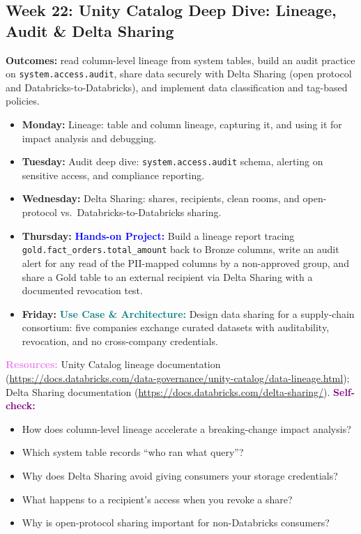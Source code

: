 \documentclass[11pt, a4paper]{article}
\newcommand{\project}[1]{\vspace{1mm}\noindent\textbf{\textcolor{blue}{Hands-on Project:}} #1}
\newcommand{\usecase}[1]{\vspace{1mm}\noindent\textbf{\textcolor{teal}{Use Case \& Architecture:}} #1}
\newcommand{\dayitem}[2]{\item \textbf{#1:} #2}
\newcommand{\resources}[1]{\vspace{1mm}\noindent\textbf{\textcolor{violet}{Resources:}} #1}
\newcommand{\selfcheck}[1]{\vspace{1mm}\noindent\textbf{\textcolor{purple}{Self-check:}} #1}
\begin{document}
\subsection*{Week 22: Unity Catalog Deep Dive: Lineage, Audit \& Delta Sharing}
\par\noindent\textbf{Outcomes:} read column-level lineage from system tables, build an audit practice on \texttt{system.access.audit}, share data securely with Delta Sharing (open protocol and Databricks-to-Databricks), and implement data classification and tag-based policies.
\begin{itemize}[label=-]
    \dayitem{Monday}{Lineage: table and column lineage, capturing it, and using it for impact analysis and debugging.}
    \dayitem{Tuesday}{Audit deep dive: \texttt{system.access.audit} schema, alerting on sensitive access, and compliance reporting.}
    \dayitem{Wednesday}{Delta Sharing: shares, recipients, clean rooms, and open-protocol vs.\ Databricks-to-Databricks sharing.}
    \dayitem{Thursday}{\project{Build a lineage report tracing \texttt{gold.fact\_orders.total\_amount} back to Bronze columns, write an audit alert for any read of the PII-mapped columns by a non-approved group, and share a Gold table to an external recipient via Delta Sharing with a documented revocation test.}}
    \dayitem{Friday}{\usecase{Design data sharing for a supply-chain consortium: five companies exchange curated datasets with auditability, revocation, and no cross-company credentials.}}
\end{itemize}
\resources{Unity Catalog lineage documentation (\url{https://docs.databricks.com/data-governance/unity-catalog/data-lineage.html}); Delta Sharing documentation (\url{https://docs.databricks.com/delta-sharing/}).}
\selfcheck{\begin{itemize}[label=-, leftmargin=1.5em, itemsep=0pt]
    \item How does column-level lineage accelerate a breaking-change impact analysis?
    \item Which system table records ``who ran what query''?
    \item Why does Delta Sharing avoid giving consumers your storage credentials?
    \item What happens to a recipient's access when you revoke a share?
    \item Why is open-protocol sharing important for non-Databricks consumers?
\end{itemize}}
\end{document}
